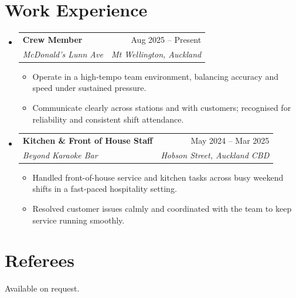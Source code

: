 \documentclass[letterpaper,11pt]{article}
\makeatletter
\newcommand{\resumeItem}[1]{\item\small{{#1}}}
\newcommand{\resumeSubheading}[4]{
  \item
    \begin{tabular*}{0.97\textwidth}[t]{l@{\extracolsep{\fill}}r}
      \textbf{#1} & #2 \\
      \textit{\small#3} & \textit{\small #4} \\
    \end{tabular*}
}
\newcommand{\resumeSubHeadingListStart}{\begin{itemize}[leftmargin=0.15in, label={}]}
\newcommand{\resumeSubHeadingListEnd}{\end{itemize}}
\newcommand{\resumeItemListStart}{\begin{itemize}[itemsep=4pt]}
\newcommand{\resumeItemListEnd}{\end{itemize}}
\makeatother
\begin{document}
\section{Work Experience}
\resumeSubHeadingListStart
\resumeSubheading
{Crew Member}{Aug 2025 -- Present}
{McDonald's Lunn Ave}{Mt Wellington, Auckland}
\resumeItemListStart
\resumeItem{Operate in a high-tempo team environment, balancing accuracy and speed under sustained pressure.}
\resumeItem{Communicate clearly across stations and with customers; recognised for reliability and consistent shift attendance.}
\resumeItemListEnd
\resumeSubheading
{Kitchen \& Front of House Staff}{May 2024 -- Mar 2025}
{Beyond Karaoke Bar}{Hobson Street, Auckland CBD}
\resumeItemListStart
\resumeItem{Handled front-of-house service and kitchen tasks across busy weekend shifts in a fast-paced hospitality setting.}
\resumeItem{Resolved customer issues calmly and coordinated with the team to keep service running smoothly.}
\resumeItemListEnd
\resumeSubHeadingListEnd

\section{Referees}
Available on request.
\end{document}
